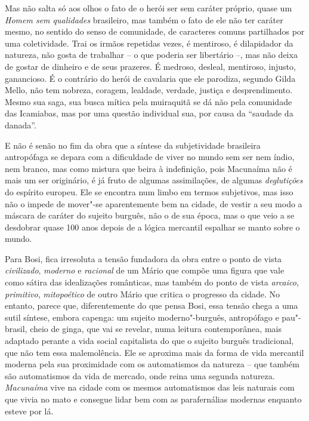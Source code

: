 Mas não salta só aos olhos o fato de o herói ser sem caráter próprio,
quase um \emph{Homem sem qualidades} brasileiro, mas também o fato de
ele não ter caráter mesmo, no sentido do senso de comunidade, de
caracteres comuns partilhados por uma coletividade. Trai os irmãos
repetidas vezes, é mentiroso, é dilapidador da natureza, não gosta de
trabalhar -- o que poderia ser libertário --, mas não deixa de gostar de
dinheiro e de seus prazeres. É medroso, desleal, mentiroso, injusto,
ganancioso. É o contrário do herói de cavalaria que ele parodiza,
segundo Gilda Mello, não tem nobreza, coragem, lealdade, verdade,
justiça e desprendimento. Mesmo sua saga, sua busca mítica pela
muiraquitã se dá não pela comunidade das Icamiabas, mas por uma questão
individual sua, por causa da ``saudade da danada''.

E não é senão no fim da obra que a síntese da subjetividade brasileira
antropófaga se depara com a dificuldade de viver no mundo sem ser nem
índio, nem branco, mas como mistura que beira à indefinição, pois
Macunaíma não é mais um ser originário, é já fruto de algumas
assimilações, de algumas \emph{deglutições} do espírito europeu. Ele se
encontra num limbo em termos subjetivos, mas isso não o impede de
mover"-se aparentemente bem na cidade, de vestir a seu modo a máscara de
caráter do sujeito burguês, não o de sua época, mas o que veio a se
desdobrar quase 100 anos depois de a lógica mercantil espalhar se manto
sobre o mundo.

Para Bosi, fica irresoluta a tensão fundadora da obra entre o ponto de
vista \emph{civilizado}, \emph{moderno} e \emph{racional} de um Mário
que compõe uma figura que vale como sátira das idealizações românticas,
mas também do ponto de vista \emph{arcaico}, \emph{primitivo},
\emph{mitopoético} de outro Mário que critica o progresso da cidade. No
entanto, parece que, diferentemente do que pensa Bosi, essa tensão chega
a uma sutil síntese, embora capenga: um sujeito moderno"-burguês,
antropófago e pau"-brasil, cheio de ginga, que vai se revelar, numa
leitura contemporânea, mais adaptado perante a vida social capitalista
do que o sujeito burguês tradicional, que não tem essa malemolência. Ele
se aproxima mais da forma de vida mercantil moderna pela sua proximidade
com os automatismos da natureza -- que também são automatismos da vida
de mercado, onde reina uma segunda natureza. \emph{Macunaíma} vive na
cidade com os mesmos automatismos das leis naturais com que vivia no
mato e consegue lidar bem com as parafernálias modernas enquanto esteve
por lá.

